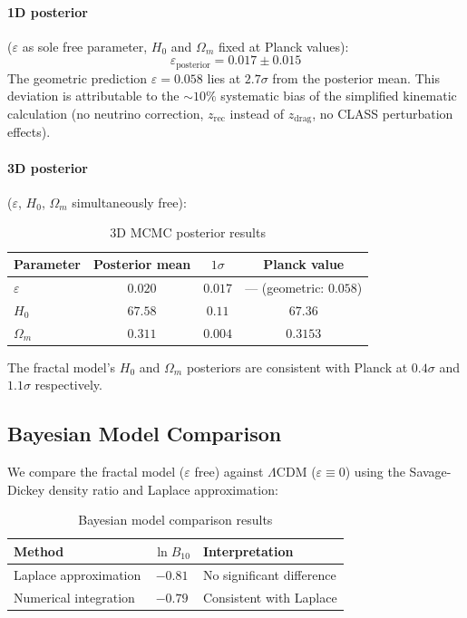 \documentclass[12pt,a4paper,twocolumn]{article}
\begin{document}
\paragraph{1D posterior} ($\varepsilon$ as sole free parameter, $H_0$ and $\Omega_m$ fixed at Planck values):
\[
\varepsilon_{\mathrm{posterior}} = 0.017 \pm 0.015
\]
The geometric prediction $\varepsilon = 0.058$ lies at $2.7\sigma$ from the posterior mean. This deviation is attributable to the $\sim 10\%$ systematic bias of the simplified kinematic calculation (no neutrino correction, $z_{\mathrm{rec}}$ instead of $z_{\mathrm{drag}}$, no CLASS perturbation effects).

\paragraph{3D posterior} ($\varepsilon$, $H_0$, $\Omega_m$ simultaneously free):

\begin{table}[H]
\centering
\caption{3D MCMC posterior results}
\label{tab:mcmc_3d}
\begin{tabular}{l|c|c|c}
\hline
Parameter & Posterior mean & $1\sigma$ & Planck value \\
\hline
$\varepsilon$ & $0.020$ & $0.017$ & --- (geometric: $0.058$) \\
$H_0$ & $67.58$ & $0.11$ & $67.36$ \\
$\Omega_m$ & $0.311$ & $0.004$ & $0.3153$ \\
\hline
\end{tabular}
\end{table}

The fractal model's $H_0$ and $\Omega_m$ posteriors are consistent with Planck at $0.4\sigma$ and $1.1\sigma$ respectively.

\subsection{Bayesian Model Comparison}
We compare the fractal model ($\varepsilon$ free) against $\Lambda$CDM ($\varepsilon \equiv 0$) using the Savage-Dickey density ratio and Laplace approximation:

\begin{table}[H]
\centering
\caption{Bayesian model comparison results}
\label{tab:bayes_cmb}
\begin{tabular}{l|c|l}
\hline
Method & $\ln B_{10}$ & Interpretation \\
\hline
Laplace approximation & $-0.81$ & No significant difference \\
Numerical integration & $-0.79$ & Consistent with Laplace \\
\hline
\end{tabular}
\end{table}
\end{document}
